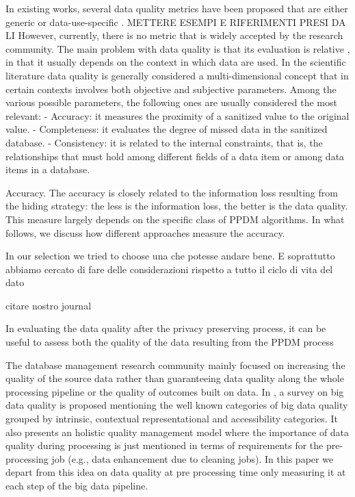 In existing works, several data quality metrics have been proposed that are
either generic or data-use-specific \cite{Majeed2021AnonymizationTF}. METTERE ESEMPI E RIFERIMENTI PRESI DA LI However, currently, there is no metric that is widely accepted by the research community. The main problem with data quality is that its evaluation is relative  \cite{dataAccuracy,dataQuality}, in that it usually depends on the context in which data are used.
In the scientific literature data quality is generally
considered a multi-dimensional concept that in certain contexts involves
both objective and subjective parameters. Among the various possible
parameters, the following ones are usually considered the most relevant:
- Accuracy: it measures the proximity of a sanitized value to the original
value.
- Completeness: it evaluates the degree of missed data in the sanitized
database.
- Consistency: it is related to the internal constraints, that is, the relationships
that must hold among different fields of a data item or among data
items in a database.

Accuracy. The accuracy is closely related to the information loss resulting
from the hiding strategy: the less is the information loss, the better is the
data quality. This measure largely depends on the specific class of PPDM algorithms.
In what follows, we discuss how different approaches measure the
accuracy.


In our selection we tried to choose una che potesse andare bene. E soprattutto abbiamo cercato di fare delle considerazioni rispetto a tutto il ciclo di vita del dato

citare nostro journal


In evaluating the data quality after the privacy preserving process, it can be
useful to assess both the quality of the data resulting from the PPDM process


The database management research community mainly focused on increasing the quality of the source data rather than guaranteeing data quality along the whole processing pipeline or the quality of outcomes built on data.
In \cite{BigDataQaulitySurvey}, a survey on big data quality is proposed mentioning the well known categories of big data quality grouped by intrinsic, contextual representational and accessibility categories.
It also presents an holistic quality management model where the importance of data quality during processing is just mentioned in terms of requirements for the pre-processing job (e.g., data enhancement due to cleaning jobs).
In this paper we depart from this idea on data quality at pre processing time only measuring it at each step of the big data pipeline.

